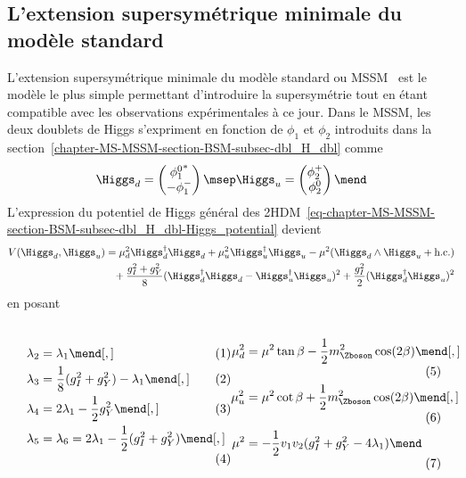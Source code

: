 \subsection{L'extension supersymétrique minimale du modèle standard}\label{chapter-MS-MSSM-section-BSM-subsec-MSSM}
L'extension supersymétrique minimale du modèle standard ou MSSM~\cite{mssm_fayet1,mssm_fayet2}
est le modèle le plus simple permettant d'introduire la supersymétrie tout en étant compatible avec les observations expérimentales à ce jour.
Dans le MSSM, les deux doublets de Higgs s'expriment en fonction de $\phi_1$ et $\phi_2$ introduits dans la section~\ref{chapter-MS-MSSM-section-BSM-subsec-dbl_H_dbl} comme~\cite{Higgs_hunter_guide}
\begin{equation}
\Higgs_d
=
\begin{pmatrix}
{\phi_1^0}^* \\ -\phi_1^-
\end{pmatrix}
\msep
\Higgs_u
=
\begin{pmatrix}
\phi_2^+ \\ \phi_2^0
\end{pmatrix}
\mend
\label{eq-chapter-MS-MSSM-section-BSM-Higgs_doublets}
\end{equation}
L'expression du potentiel de Higgs général des 2HDM~\eqref{eq-chapter-MS-MSSM-section-BSM-subsec-dbl_H_dbl-Higgs_potential} devient
\begin{align}
V(\Higgs_d,\Higgs_u)
&
=
\mu_d^2\Higgs_d^\dagger\Higgs_d
+
\mu_u^2\Higgs_u^\dagger\Higgs_u
-
\mu^2 (\Higgs_d\wedge\Higgs_u+\text{h.c.})
\nonumber\\
&\hphantom{=}
+
\frac{g_I^2+g_Y^2}{8} (\Higgs_d^\dagger\Higgs_d-\Higgs_u^\dagger\Higgs_u)^2
+
\frac{g_I^2}{2} (\Higgs_d^\dagger\Higgs_u)^2
\end{align}
en posant~\cite{Higgs_hunter_guide,Higgs_hunter_guide_errata,Nagashima_BSM}
\vspace{-.5\baselineskip}\par\noindent
\begin{subequations}
\noindent
\begin{minipage}[c]{.49\textwidth}
\begin{align}
\lambda_2 &= \lambda_1 \mend[,]\\
\lambda_3 &= \frac{1}{8} (g_I^2+g_Y^2)-\lambda_1 \mend[,]\\
\lambda_4 &= 2\lambda_1 - \frac{1}{2} g_Y^2 \mend[,]\\
\lambda_5 &= \lambda_6 = 2\lambda_1 - \frac{1}{2}(g_I^2+g_Y^2) \mend[,]
\end{align}
\end{minipage}
\hfill
\begin{minipage}[c]{.49\textwidth}
\begin{align}
\mu_d^2 &= \mu^2\tan\beta - \frac{1}{2} m_{\Zboson}^2 \cos(2\beta) \mend[,]\\
\mu_u^2 &= \mu^2\cot\beta + \frac{1}{2} m_{\Zboson}^2 \cos(2\beta) \mend[,]\\
\mu^2 &= -\frac{1}{2}v_1v_2(g_I^2+g_Y^2-4\lambda_1)
\mend
\end{align}
\end{minipage}
\end{subequations}
